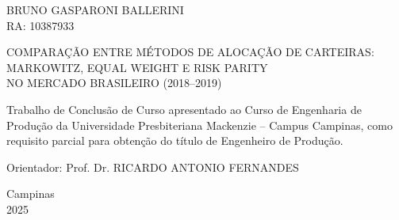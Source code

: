 
\thispagestyle{empty}

\begin{center}

\vspace*{2cm}

{\fontsize{12}{14.4}\selectfont\MakeUppercase{BRUNO GASPARONI BALLERINI}}\\[0.3cm]
{\fontsize{12}{14.4}\selectfont RA: 10387933}

\vspace{4cm}

{\fontsize{12}{14.4}\selectfont\MakeUppercase{%
COMPARAÇÃO ENTRE MÉTODOS DE ALOCAÇÃO DE CARTEIRAS:\\[0.3cm]
MARKOWITZ, EQUAL WEIGHT E RISK PARITY\\[0.3cm]
NO MERCADO BRASILEIRO (2018–2019)%
}}

\vspace{3cm}

\end{center}

\begin{center}
\begin{minipage}{8cm}
\fontsize{11}{13.2}\selectfont
\setlength{\parindent}{0cm}
\setlength{\parskip}{0pt}

Trabalho de Conclusão de Curso apresentado ao Curso de Engenharia de Produção da Universidade Presbiteriana Mackenzie -- Campus Campinas, como requisito parcial para obtenção do título de Engenheiro de Produção.

\vspace{1.5cm}

\noindent Orientador: Prof. Dr. RICARDO ANTONIO FERNANDES

\end{minipage}
\end{center}

\vfill

\begin{center}
{\fontsize{12}{14.4}\selectfont
Campinas\\[0.3cm]
2025}
\end{center}